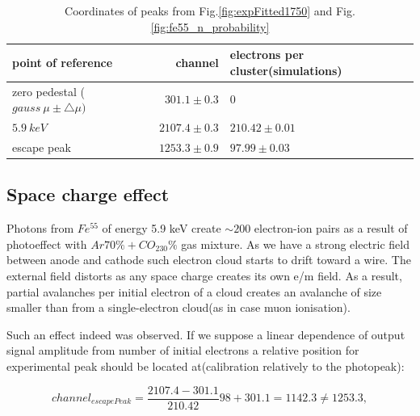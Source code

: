 \documentclass[12pt,a4paper]{article}
\begin{document}
	
	\begin{table}[!h]
	\centering
	\begin{tabular}{|l|r|l|}
		\hline
		point of reference & channel & electrons per cluster(simulations)\\
		\hline
		zero pedestal ($gauss~\mu \pm \bigtriangleup \mu)$ & $301.1 \pm 0.3 $ & 0\\
		\hline
		$5.9~keV$ & $2107.4 \pm 0.3$ & $210.42 \pm 0.01$ \\ 
		\hline
		escape peak & $1253.3 \pm 0.9 $ & $97.99 \pm 0.03$ \\
		\hline
	\end{tabular}
	\caption{ Coordinates of peaks from Fig.\ref{fig:expFitted1750} and Fig.\ref{fig:fe55_n_probability}}
	\label{table:peakPos}
	\end{table}
	
	\subsection{ Space charge effect}
	
	Photons from $Fe^{55}$ of energy 5.9 keV create $\sim 200$ electron-ion pairs as a result of photoeffect with $Ar70\%+CO_230\%$ gas mixture. As we have a strong electric field between anode and cathode such electron cloud starts to drift toward a wire. The external field distorts as any space charge creates its own e/m field. As a result, partial avalanches per initial electron of a cloud creates an avalanche of size smaller than from a single-electron cloud(as in case muon ionisation).
	
	Such an effect indeed was observed. If we suppose a linear dependence of output signal amplitude from number of initial electrons a relative position for experimental peak should be located at(calibration relatively to the photopeak):
	
	\begin{equation}
			channel_{escapePeak} = \frac{2107.4 - 301.1}{210.42} 98 + 301.1 = 1142.3 \ne 1253.3,
	\end{equation}
	
\end{document}

